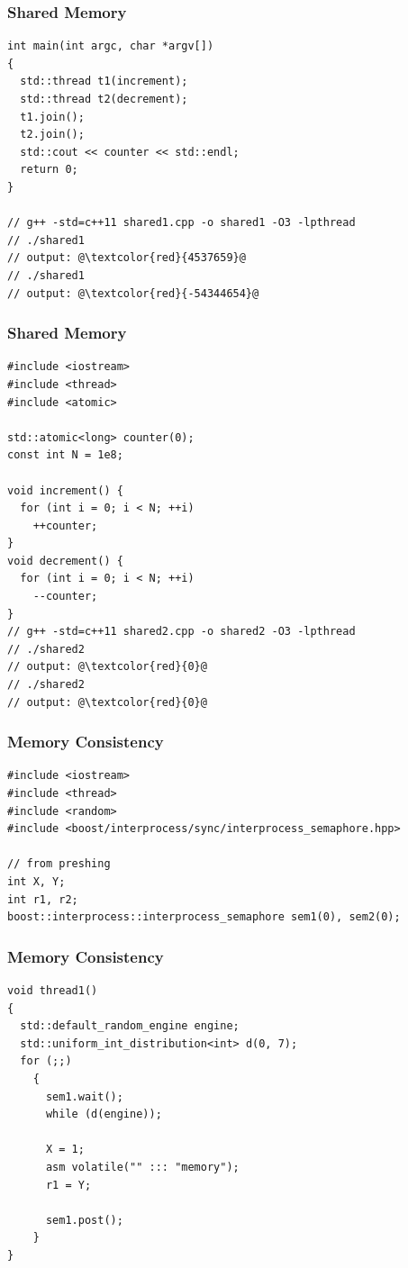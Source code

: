 \documentclass{beamer}
\begin{document}
\begin{frame}[fragile]
\frametitle{Shared Memory}
\scriptsize
\begin{lstlisting}
int main(int argc, char *argv[])
{
  std::thread t1(increment);
  std::thread t2(decrement);
  t1.join();
  t2.join();
  std::cout << counter << std::endl;
  return 0;
}

// g++ -std=c++11 shared1.cpp -o shared1 -O3 -lpthread
// ./shared1
// output: @\textcolor{red}{4537659}@
// ./shared1
// output: @\textcolor{red}{-54344654}@
\end{lstlisting}

\end{frame}

\begin{frame}[fragile]
\frametitle{Shared Memory}
\scriptsize
\begin{lstlisting}[linebackgroundcolor={\lstcolorlines{5}}]
#include <iostream>
#include <thread>
#include <atomic>

std::atomic<long> counter(0);
const int N = 1e8;

void increment() {
  for (int i = 0; i < N; ++i)
    ++counter;
}
void decrement() {
  for (int i = 0; i < N; ++i)
    --counter;
}
// g++ -std=c++11 shared2.cpp -o shared2 -O3 -lpthread
// ./shared2
// output: @\textcolor{red}{0}@
// ./shared2
// output: @\textcolor{red}{0}@
\end{lstlisting}

\end{frame}

\begin{frame}[fragile]
\frametitle{Memory Consistency}
\scriptsize
\begin{lstlisting}[linebackgroundcolor={\lstcolorlines{7,8}}]
#include <iostream>
#include <thread>
#include <random>
#include <boost/interprocess/sync/interprocess_semaphore.hpp>

// from preshing
int X, Y;
int r1, r2;
boost::interprocess::interprocess_semaphore sem1(0), sem2(0);
\end{lstlisting}

\end{frame}

\begin{frame}[fragile]
\frametitle{Memory Consistency}
\scriptsize
\begin{lstlisting}[linebackgroundcolor={\lstcolorlines{10,11,12}}]
void thread1()
{
  std::default_random_engine engine;
  std::uniform_int_distribution<int> d(0, 7);
  for (;;)
    {
      sem1.wait();
      while (d(engine));

      X = 1;
      asm volatile("" ::: "memory");
      r1 = Y;

      sem1.post();
    }
}
\end{lstlisting}

\end{frame}
\end{document}
